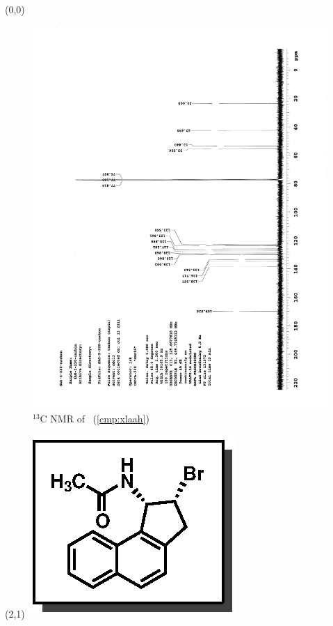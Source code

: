 \clearpage
\begin{textblock}{20}(0,0)
\begin{figure}[htb]
\caption{$^{13}$C NMR of  \CMPxlaah\ (\ref{cmp:xlaah})}
\includegraphics[scale=0.75, trim = 0mm 0mm 0mm 5mm,
clip]{chp_asymmetric/images/nmr/xlaahC}
\vspace{-100pt}
\end{figure}
\end{textblock}
\begin{textblock}{1}(2,1)
\includegraphics[scale=0.8, angle=90]{chp_asymmetric/images/xlaah}
\end{textblock}
\clearpage

